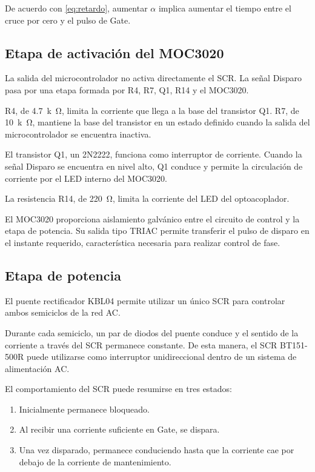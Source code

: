 \documentclass[12pt]{article}
\begin{document}
De acuerdo con \cref{eq:retardo}, aumentar $\alpha$ implica aumentar el tiempo
entre el cruce por cero y el pulso de Gate.

\subsection{Etapa de activación del MOC3020}

La salida del microcontrolador no activa directamente el SCR. La señal
Disparo pasa por una etapa formada por R4, R7, Q1, R14 y el MOC3020.

R4, de \SI{4.7}{k\ohm}, limita la corriente que llega a la base del transistor
Q1. R7, de \SI{10}{k\ohm}, mantiene la base del transistor en un estado
definido cuando la salida del microcontrolador se encuentra inactiva.

El transistor Q1, un 2N2222, funciona como interruptor de corriente. Cuando
la señal Disparo se encuentra en nivel alto, Q1 conduce y permite la
circulación de corriente por el LED interno del MOC3020.

La resistencia R14, de \SI{220}{\ohm}, limita la corriente del LED del
optoacoplador.

El MOC3020 proporciona aislamiento galvánico entre el circuito de control y
la etapa de potencia. Su salida tipo TRIAC permite transferir el pulso de
disparo en el instante requerido, característica necesaria para realizar
control de fase.

\subsection{Etapa de potencia}

El puente rectificador KBL04 permite utilizar un único SCR para controlar
ambos semiciclos de la red AC.

Durante cada semiciclo, un par de diodos del puente conduce y el sentido de
la corriente a través del SCR permanece constante. De esta manera, el SCR
BT151-500R puede utilizarse como interruptor unidireccional dentro de un
sistema de alimentación AC.

El comportamiento del SCR puede resumirse en tres estados:

\begin{enumerate}
    \item Inicialmente permanece bloqueado.
    \item Al recibir una corriente suficiente en Gate, se dispara.
    \item Una vez disparado, permanece conduciendo hasta que la corriente
    cae por debajo de la corriente de mantenimiento.
\end{enumerate}
\end{document}
